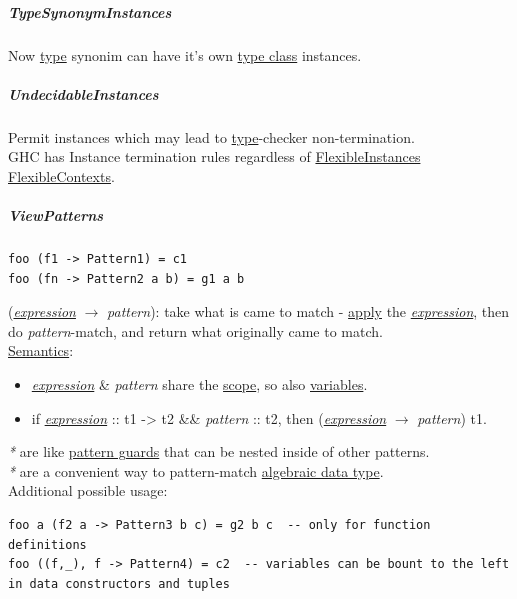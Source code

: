 \documentclass[11pt]{article}
\begin{document}
\subparagraph{\label{org4f19817}TypeSynonymInstances}
\label{sec:org64d3aa6}
Now \hyperref[org4fbaeb8]{type} synonim can have it's own \hyperref[orga4a5066]{type class} instances.\\

\subparagraph{\label{orga6dfaea}UndecidableInstances}
\label{sec:org5cf97bd}
Permit instances which may lead to \hyperref[org4fbaeb8]{type}-checker non-termination.\\

GHC has Instance termination rules regardless of \hyperref[org942c073]{FlexibleInstances} \hyperref[org1ccc264]{FlexibleContexts}.\\

\subparagraph{\label{org3ad9e4c}ViewPatterns}
\label{sec:orgf2ef873}
\begin{verbatim}
foo (f1 -> Pattern1) = c1
foo (fn -> Pattern2 a b) = g1 a b
\end{verbatim}
(\emph{\hyperref[org667db83]{expression}} \(\to\) \emph{pattern}): take what is came to match - \hyperref[orgfed746a]{apply} the \emph{\hyperref[org667db83]{expression}}, then do \emph{pattern}-match, and return what originally came to match.\\

\hyperref[org2f919bf]{Semantics}:\\
\begin{itemize}
\item \emph{\hyperref[org667db83]{expression}} \& \emph{pattern} share the \hyperref[orga4eed83]{scope}, so also \hyperref[orgd3f3ade]{variables}.\\
\item{if \emph{\hyperref[org667db83]{expression}} :: t1 -> t2 \&\& \emph{pattern} :: t2, then (\emph{\hyperref[org667db83]{expression}} \(\to\) \emph{pattern})} t1.\\
\end{itemize}

\emph{*} are like \hyperref[org3d3dda8]{pattern guards} that can be nested inside of other patterns.\\
\emph{*} are a convenient way to pattern-match \hyperref[orgeba275a]{algebraic data type}.\\

Additional possible usage:\\
\begin{verbatim}
foo a (f2 a -> Pattern3 b c) = g2 b c  -- only for function definitions
foo ((f,_), f -> Pattern4) = c2  -- variables can be bount to the left in data constructors and tuples
\end{verbatim}
\end{document}
